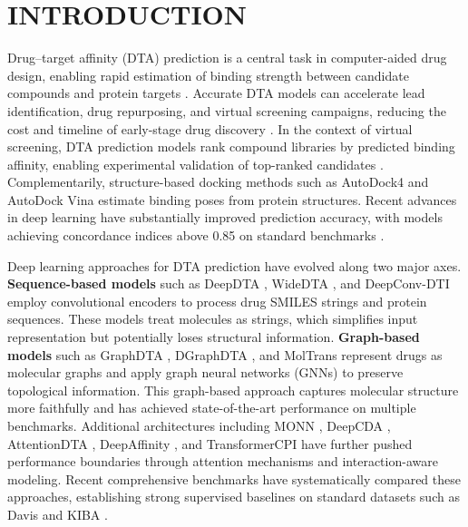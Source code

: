 \documentclass[10pt,a4paper,twocolumn]{article}
\begin{document}
\section{INTRODUCTION}

Drug--target affinity (DTA) prediction is a central task in computer-aided drug design, enabling rapid estimation of binding strength between candidate compounds and protein targets \cite{ozturk2018deepdta,nguyen2021graphdta}. Accurate DTA models can accelerate lead identification, drug repurposing, and virtual screening campaigns, reducing the cost and timeline of early-stage drug discovery \cite{vamathevan2019applications,huang2022artificial}. In the context of virtual screening, DTA prediction models rank compound libraries by predicted binding affinity, enabling experimental validation of top-ranked candidates \cite{abbasi2021deepdti,gorgulla2020virtual,tsubaki2019cpi}. Complementarily, structure-based docking methods such as AutoDock4 \cite{morris2009autodock4} and AutoDock Vina \cite{trott2010vina} estimate binding poses from protein structures. Recent advances in deep learning have substantially improved prediction accuracy, with models achieving concordance indices above 0.85 on standard benchmarks \cite{bagherian2021ml,chen2016dti}.

Deep learning approaches for DTA prediction have evolved along two major axes. \textbf{Sequence-based models} such as DeepDTA \cite{ozturk2018deepdta}, WideDTA \cite{ozturk2019widedta}, and DeepConv-DTI \cite{lee2019deepconvdti} employ convolutional encoders to process drug SMILES strings and protein sequences. These models treat molecules as strings, which simplifies input representation but potentially loses structural information. \textbf{Graph-based models} such as GraphDTA \cite{nguyen2021graphdta}, DGraphDTA \cite{jiang2021dgraphdta}, and MolTrans \cite{huang2021moltrans} represent drugs as molecular graphs and apply graph neural networks (GNNs) \cite{xu2019powerful,velickovic2018gat,kipf2017semi,gilmer2017mpnn,schutt2018schnet,dwivedi2023benchmark,hamilton2017graphsage,ying2018diffpool} to preserve topological information. This graph-based approach captures molecular structure more faithfully and has achieved state-of-the-art performance on multiple benchmarks. Additional architectures including MONN \cite{li2020monn}, DeepCDA \cite{abbasi2020deepcda}, AttentionDTA \cite{zhao2023attentiondta}, DeepAffinity \cite{karimi2019deepaffinity}, and TransformerCPI \cite{chen2020transformercpi} have further pushed performance boundaries through attention mechanisms and interaction-aware modeling. Recent comprehensive benchmarks \cite{bagherian2021ml,chen2016dti} have systematically compared these approaches, establishing strong supervised baselines on standard datasets such as Davis \cite{davis2011predicting} and KIBA \cite{tang2014kiba}.
\end{document}
